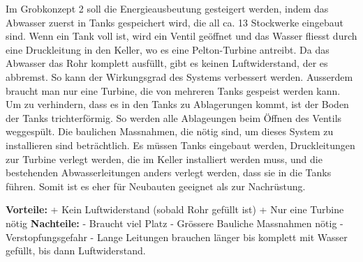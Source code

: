 Im Grobkonzept 2 soll die Energieausbeutung gesteigert werden, indem das Abwasser zuerst in Tanks gespeichert wird, die all ca. 13 Stockwerke eingebaut sind. Wenn ein Tank voll ist, wird ein Ventil geöffnet und das Wasser fliesst durch eine Druckleitung in den Keller, wo es eine Pelton-Turbine antreibt. Da das Abwasser das Rohr komplett ausfüllt, gibt es keinen Luftwiderstand, der es abbremst. So kann der Wirkungsgrad des Systems verbessert werden. Ausserdem braucht man nur eine Turbine, die von mehreren Tanks gespeist werden kann. Um zu verhindern, dass es in den Tanks zu Ablagerungen kommt, ist der Boden der Tanks trichterförmig. So werden alle Ablageungen beim Öffnen des Ventils weggespült. 
Die baulichen Massnahmen, die nötig sind, um dieses System zu installieren sind beträchtlich. Es müssen Tanks eingebaut werden, Druckleitungen zur Turbine verlegt werden, die im Keller installiert werden muss, und die bestehenden Abwasserleitungen anders verlegt werden, dass sie in die Tanks führen. Somit ist es eher für Neubauten geeignet als zur Nachrüstung.

\textbf{Vorteile:} 									\newline
+	Kein Luftwiderstand (sobald Rohr gefüllt ist)	\newline
+	Nur eine Turbine nötig							\newline
\textbf{Nachteile:}									\newline
-	Braucht viel Platz 								\newline
-	Grössere Bauliche Massnahmen nötig				\newline
-	Verstopfungsgefahr 								\newline
-	Lange Leitungen brauchen länger bis komplett mit Wasser gefüllt, bis dann Luftwiderstand.
